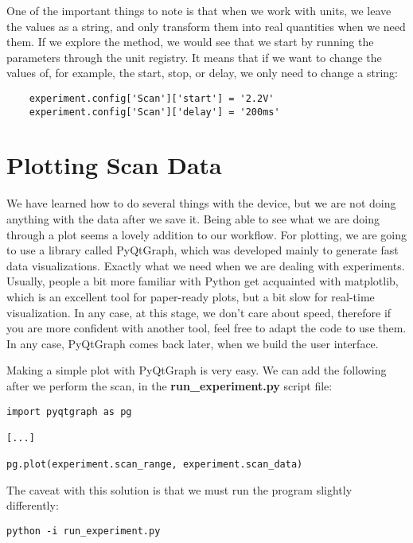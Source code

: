 One of the important things to note is that when we work with units, we leave the values as a string, and only transform them into real quantities when we need them. If we explore the  method, we would see that we start by running the parameters through the unit registry. It means that if we want to change the values of, for example, the start, stop, or delay, we only need to change a string:

\begin{verbatim}
    experiment.config['Scan']['start'] = '2.2V'
    experiment.config['Scan']['delay'] = '200ms'
\end{verbatim}

\section{Plotting Scan Data}\label{sec:basic-plotting}
We have learned how to do several things with the device, but we are not doing anything with the data after we save it. Being able to see what we are doing through a plot seems a lovely addition to our workflow. For plotting, we are going to use a library called PyQtGraph, which was developed mainly to generate fast data visualizations. Exactly what we need when we are dealing with experiments. Usually, people a bit more familiar with Python get acquainted with matplotlib, which is an excellent tool for paper-ready plots, but a bit slow for real-time visualization. In any case, at this stage, we don't care about speed, therefore if you are more confident with another tool, feel free to adapt the code to use them. In any case, PyQtGraph comes back later, when we build the user interface.

Making a simple plot with PyQtGraph is very easy. We can add the following after we perform the scan, in the \textbf{run\_experiment.py} script file:

\begin{verbatim}
import pyqtgraph as pg

[...]

pg.plot(experiment.scan_range, experiment.scan_data)
\end{verbatim}

The caveat with this solution is that we must run the program slightly differently:

\begin{verbatim}
python -i run_experiment.py
\end{verbatim}

